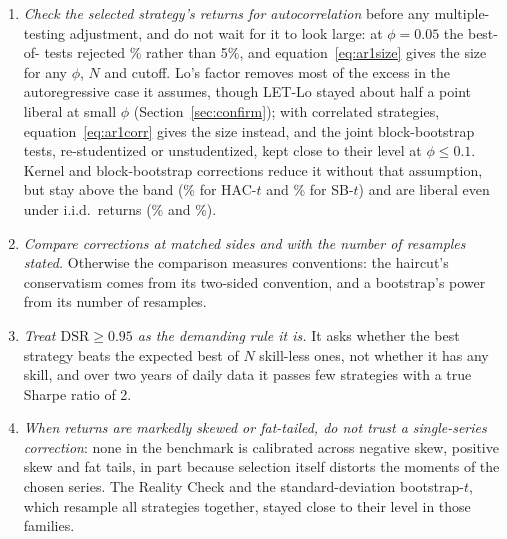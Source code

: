 \begin{enumerate}
  The fix matters most for single-strategy calls and for searches with many poor variants.
  \item \emph{Check the selected strategy's returns for autocorrelation} before any multiple-testing adjustment, and do not wait for it to look large: at $\phi=0.05$ the best-of- tests rejected \% rather than 5\%, and equation~\eqref{eq:ar1size} gives the size for any $\phi$, $N$ and cutoff. Lo's factor removes most of the excess in the autoregressive case it assumes, though LET-Lo stayed about half a point liberal at small $\phi$ (Section~\ref{sec:confirm}); with correlated strategies, equation~\eqref{eq:ar1corr} gives the size instead, and the joint block-bootstrap tests, re-studentized or unstudentized, kept close to their level at $\phi\le0.1$. Kernel and block-bootstrap corrections reduce it without that assumption, but stay above the band (\% for HAC-$t$ and \% for SB-$t$) and are liberal even under i.i.d.\ returns (\% and \%).
  \item \emph{Compare corrections at matched sides and with the number of resamples stated.} Otherwise the comparison measures conventions: the haircut's conservatism comes from its two-sided convention, and a bootstrap's power from its number of resamples.
  \item \emph{Treat $\mathrm{DSR}\ge 0.95$ as the demanding rule it is.} It asks whether the best strategy beats the expected best of $N$ skill-less ones, not whether it has any skill, and over two years of daily data it passes few strategies with a true Sharpe ratio of 2.
  \item \emph{When returns are markedly skewed or fat-tailed, do not trust a single-series correction}: none in the benchmark is calibrated across negative skew, positive skew and fat tails, in part because selection itself distorts the moments of the chosen series. The Reality Check and the standard-deviation bootstrap-$t$, which resample all strategies together, stayed close to their level in those families.
\end{enumerate}


